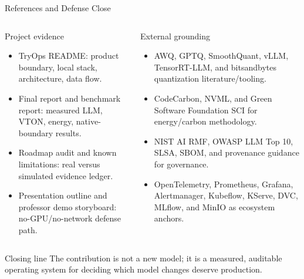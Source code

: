 \documentclass[aspectratio=169,10pt]{beamer}
\begin{document}
\begin{frame}{References and Defense Close}
  \tiny
  \begin{columns}[T,totalwidth=\textwidth]
    \begin{block}{Project evidence}
      \begin{itemize}\itemsep0.18em
        \item TryOps README: product boundary, local stack, architecture, data flow.
        \item Final report and benchmark report: measured LLM, VTON, energy, native-boundary results.
        \item Roadmap audit and known limitations: real versus simulated evidence ledger.
        \item Presentation outline and professor demo storyboard: no-GPU/no-network defense path.
      \end{itemize}
    \end{block}

    \begin{block}{External grounding}
      \begin{itemize}\itemsep0.18em
        \item AWQ, GPTQ, SmoothQuant, vLLM, TensorRT-LLM, and bitsandbytes quantization literature/tooling.
        \item CodeCarbon, NVML, and Green Software Foundation SCI for energy/carbon methodology.
        \item NIST AI RMF, OWASP LLM Top 10, SLSA, SBOM, and provenance guidance for governance.
        \item OpenTelemetry, Prometheus, Grafana, Alertmanager, Kubeflow, KServe, DVC, MLflow, and MinIO as ecosystem anchors.
      \end{itemize}
    \end{block}
  \end{columns}

  \vspace{0.18cm}
  \begin{alertblock}{Closing line}
    The contribution is not a new model; it is a measured, auditable operating system for deciding which model changes deserve production.
  \end{alertblock}
\end{frame}
\end{document}
